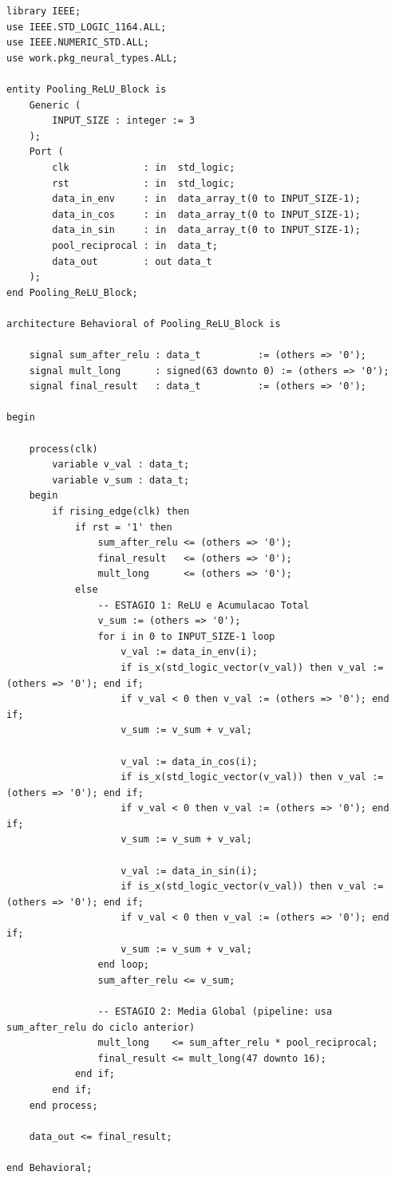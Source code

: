 \documentclass[a4paper,12pt]{article}
\begin{document}
\begin{lstlisting}[style=vhdlstyle,
    caption={C\'odigo VHDL do \texttt{Pooling\_ReLU\_Block}.},
    label={lst:pooling}]
library IEEE;
use IEEE.STD_LOGIC_1164.ALL;
use IEEE.NUMERIC_STD.ALL;
use work.pkg_neural_types.ALL;

entity Pooling_ReLU_Block is
    Generic (
        INPUT_SIZE : integer := 3
    );
    Port (
        clk             : in  std_logic;
        rst             : in  std_logic;
        data_in_env     : in  data_array_t(0 to INPUT_SIZE-1);
        data_in_cos     : in  data_array_t(0 to INPUT_SIZE-1);
        data_in_sin     : in  data_array_t(0 to INPUT_SIZE-1);
        pool_reciprocal : in  data_t;
        data_out        : out data_t
    );
end Pooling_ReLU_Block;

architecture Behavioral of Pooling_ReLU_Block is

    signal sum_after_relu : data_t          := (others => '0');
    signal mult_long      : signed(63 downto 0) := (others => '0');
    signal final_result   : data_t          := (others => '0');

begin

    process(clk)
        variable v_val : data_t;
        variable v_sum : data_t;
    begin
        if rising_edge(clk) then
            if rst = '1' then
                sum_after_relu <= (others => '0');
                final_result   <= (others => '0');
                mult_long      <= (others => '0');
            else
                -- ESTAGIO 1: ReLU e Acumulacao Total
                v_sum := (others => '0');
                for i in 0 to INPUT_SIZE-1 loop
                    v_val := data_in_env(i);
                    if is_x(std_logic_vector(v_val)) then v_val := (others => '0'); end if;
                    if v_val < 0 then v_val := (others => '0'); end if;
                    v_sum := v_sum + v_val;

                    v_val := data_in_cos(i);
                    if is_x(std_logic_vector(v_val)) then v_val := (others => '0'); end if;
                    if v_val < 0 then v_val := (others => '0'); end if;
                    v_sum := v_sum + v_val;

                    v_val := data_in_sin(i);
                    if is_x(std_logic_vector(v_val)) then v_val := (others => '0'); end if;
                    if v_val < 0 then v_val := (others => '0'); end if;
                    v_sum := v_sum + v_val;
                end loop;
                sum_after_relu <= v_sum;

                -- ESTAGIO 2: Media Global (pipeline: usa sum_after_relu do ciclo anterior)
                mult_long    <= sum_after_relu * pool_reciprocal;
                final_result <= mult_long(47 downto 16);
            end if;
        end if;
    end process;

    data_out <= final_result;

end Behavioral;
\end{lstlisting}
\end{document}
